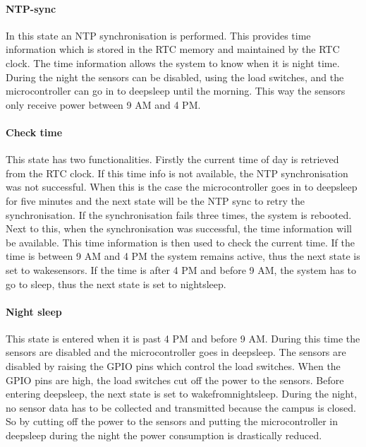 \documentclass[11pt,a4paper]{article}
\begin{document}
\paragraph{NTP-sync}
In this state an NTP synchronisation is performed. This provides time information which is stored in the RTC memory and maintained by the RTC clock. The time information allows the system to know when it is night time. During the night the sensors can be disabled, using the load switches, and the microcontroller can go in to deepsleep until the morning. This way the sensors only receive power between 9 AM and 4 PM. 

\paragraph{Check time}
This state has two functionalities. Firstly the current time of day is retrieved from the RTC clock. If this time info is not available, the NTP synchronisation was not successful. When this is the case the microcontroller goes in to deepsleep for five minutes and the next state will be the NTP sync to retry the synchronisation. If the synchronisation fails three times, the system is rebooted. Next to this, when the synchronisation was successful, the time information will be available. This time information is then used to check the current time. If the time is between 9 AM and 4 PM the system remains active, thus the next state is set to wakesensors. If the time is after 4 PM and before 9 AM, the system has to go to sleep, thus the next state is set to nightsleep.

\paragraph{Night sleep}
This state is entered when it is past 4 PM and before 9 AM. During this time the sensors are disabled and the microcontroller goes in deepsleep. The sensors are disabled by raising the GPIO pins which control the load switches. When the GPIO pins are high, the load switches cut off the power to the sensors. Before entering deepsleep, the next state is set to wakefromnightsleep. During the night, no sensor data has to be collected and transmitted because the campus is closed. So by cutting off the power to the sensors and putting the microcontroller in deepsleep during the night the power consumption is drastically reduced. 
\end{document}
